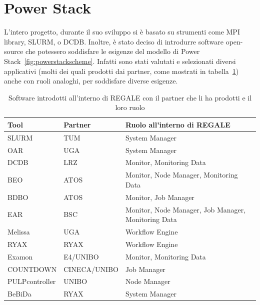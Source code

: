 \section{Power Stack}
L'intero progetto, durante il suo sviluppo si è basato su strumenti come MPI library\cite{mpi}, SLURM\cite{slurm}, o DCDB\cite{dcdb}. Inoltre, è stato deciso di introdurre software open-source che potessero soddisfare le esigenze del modello di Power Stack~\ref{fig:powerstackscheme}. Infatti sono stati valutati e selezionati diversi applicativi (molti dei quali prodotti dai partner, come mostrati in tabella~\ref{table:REGALE}) anche con ruoli analoghi, per soddisfare diverse esigenze.
\begin{table}[ht]
    \centering
    \begin{tabular}{l|l|l}
    \hline
    \textbf{Tool} & \textbf{Partner} & \textbf{Ruolo all'interno di REGALE} \\
    \hline
    SLURM & TUM & System Manager \\
    \hline
    OAR & UGA & System Manager \\
    \hline
    DCDB & LRZ & Monitor, Monitoring Data \\
    \hline
    BEO & ATOS & Monitor, Node Manager, Monitoring Data \\
    \hline
    BDBO & ATOS & Monitor, Job Manager \\
    \hline
    EAR & BSC & Monitor, Node Manager, Job Manager, Monitoring Data \\
    \hline
    Melissa & UGA & Workflow Engine \\
    \hline
    RYAX & RYAX & Workflow Engine \\
    \hline
    Examon & E4/UNIBO & Monitor, Monitoring Data \\
    \hline
    COUNTDOWN & CINECA/UNIBO & Job Manager \\
    \hline
    PULPcontroller & UNIBO & Node Manager \\
    \hline
    BeBiDa & RYAX & System Manager \\
    \hline
\end{tabular}
\caption{Software introdotti all'interno di REGALE con il partner che li ha prodotti e il loro ruolo}\label{table:REGALE}
\end{table}

